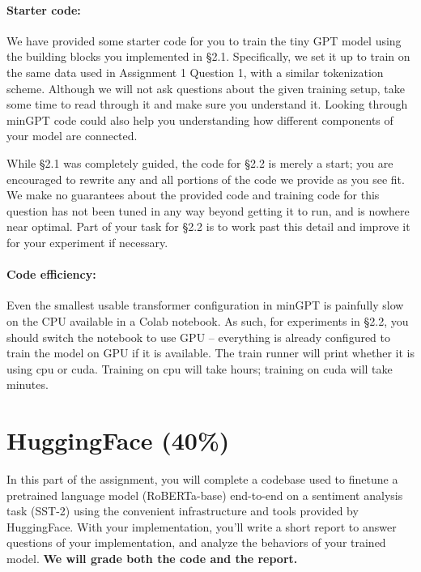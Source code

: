 \documentclass{article}
\newcommand{\sst}{SST-2\xspace}
\newcommand{\modelthree}{RoBERTa-base\xspace}
\begin{document}
    \paragraph{Starter code:}

    We have provided some starter code for you to train the tiny GPT model using
    the building blocks you implemented in \S 2.1. Specifically, we set it up to
    train on the same data used in Assignment 1 Question 1, with a similar
    tokenization scheme. Although we will not ask questions about the given
    training setup, take some time to read through it and make sure you
    understand it. Looking through minGPT code could also help you understanding
    how different components of your model are connected.

    While \S 2.1 was completely guided, the code for \S 2.2 is merely a start;
    you are encouraged to rewrite any and all portions of the code we provide as
    you see fit. We make no guarantees about the provided code and training code
    for this question has not been tuned in any way beyond getting it to run,
    and is nowhere near optimal. Part of your task for \S 2.2 is to work past
    this detail and improve it for your experiment if necessary. 

    \paragraph{Code efficiency:}
    Even the smallest usable transformer configuration in minGPT is painfully
    slow on the CPU available in a Colab notebook. As such, for experiments in
    \S 2.2, you should switch the notebook to use GPU -- everything is already
    configured to train the model on GPU if it is available. The train runner
    will print whether it is using cpu or cuda. Training on cpu will take hours;
    training on cuda will take minutes.

\newpage

\section{HuggingFace (40\%)}

In this part of the assignment, you will complete a codebase used to finetune a
pretrained language model (\modelthree) end-to-end on a sentiment analysis task
(\sst) using the convenient infrastructure and tools provided by HuggingFace.
With your implementation, you'll write a short report to answer questions of
your implementation, and analyze the behaviors of your trained model. \textbf{We
will grade both the code and the report.}
\end{document}
